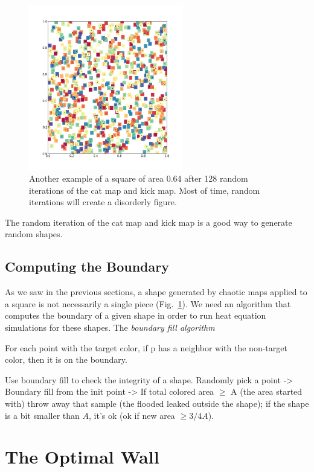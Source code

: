 \documentclass[12pt]{reedmcm}
\begin{document}
%
\begin{figure}[t]
  \centering
  \includegraphics[width=0.6\textwidth]{chaotic_shape}
  \caption{Another example of a square of area 0.64 after 128 random iterations of the cat map and kick map.
  Most of time, random iterations will create a disorderly figure.
  }
  \label{fig:chaotic}
\end{figure}

The random iteration of the cat map and kick map is a good way to generate random shapes.

\subsection{Computing the Boundary}
As we saw in the previous sections, a shape generated by chaotic maps applied to a square is not necessarily a single piece (Fig.~\ref{fig:chaotic}).
We need an algorithm that computes the boundary of a given shape in order to run heat equation simulations for these shapes.
The \textit{boundary fill algorithm} 

For each point with the target color, if p has a neighbor with the non-target color, then it is on the boundary.

Use boundary fill to check the integrity of a shape.
Randomly pick a point -> Boundary fill from the init point -> If total colored area $\geq$ A (the area started with) throw away that sample (the flooded leaked outside the shape); if the shape is a bit smaller than $A$, it's ok (ok if new area $\geq 3/4 A$).


\section{The Optimal Wall}
\end{document}
